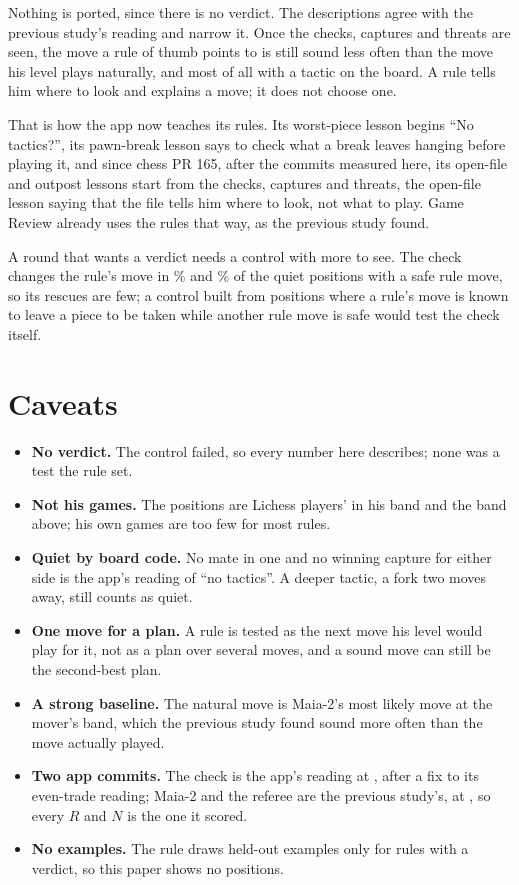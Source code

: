\documentclass[11pt]{article}
\begin{document}
Nothing is ported, since there is no verdict. The descriptions agree with the previous study's
reading and narrow it. Once the checks, captures and threats are seen, the move a rule of thumb
points to is still sound less often than the move his level plays naturally, and most of all with a
tactic on the board. A rule tells him where to look and explains a move; it does not choose one.

That is how the app now teaches its rules. Its worst-piece lesson begins ``No tactics?'', its
pawn-break lesson says to check what a break leaves hanging before playing it, and since chess PR
165, after the commits measured here, its open-file and outpost lessons start from the checks,
captures and threats, the open-file lesson saying that the file tells him where to look, not what to
play. Game Review already uses the rules that way, as the previous study found.

A round that wants a verdict needs a control with more to see. The check changes the rule's move in
\ControlShareTrain\% and \ControlShareHeld\% of the quiet positions with a safe rule move, so its
rescues are few; a control built from positions where a rule's move is known to leave a piece to be
taken while another rule move is safe would test the check itself.

\section{Caveats}

\begin{itemize}[nosep]
\item \textbf{No verdict.} The control failed, so every number here describes; none was a test the
  rule set.
\item \textbf{Not his games.} The positions are Lichess players' in his band and the band above;
  his own games are too few for most rules.
\item \textbf{Quiet by board code.} No mate in one and no winning capture for either side is the
  app's reading of ``no tactics''. A deeper tactic, a fork two moves away, still counts as quiet.
\item \textbf{One move for a plan.} A rule is tested as the next move his level would play for it,
  not as a plan over several moves, and a sound move can still be the second-best plan.
\item \textbf{A strong baseline.} The natural move is Maia-2's most likely move at the mover's band,
  which the previous study found sound more often than the move actually played.
\item \textbf{Two app commits.} The check is the app's reading at \texttt{\CheckCommit}, after a fix
  to its even-trade reading; Maia-2 and the referee are the previous study's, at
  \texttt{\ScoreCommit}, so every $R$ and $N$ is the one it scored.
\item \textbf{No examples.} The rule draws held-out examples only for rules with a verdict, so this
  paper shows no positions.
\end{itemize}
\end{document}
